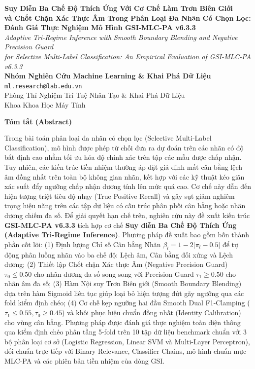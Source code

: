 \documentclass[10pt,a4paper,twoside]{article}
\begin{document}
\thispagestyle{firstpage}

\begin{center}
    {\LARGE\bfseries Suy Diễn Ba Chế Độ Thích Ứng Với Cơ Chế Làm Trơn Biên Giới\\ và Chốt Chặn Xác Thực Âm Trong Phân Loại Đa Nhãn Có Chọn Lọc:\\[0.3em] Đánh Giá Thực Nghiệm Mô Hình GSI-MLC-PA v6.3.3}\\[0.6em]
    {\large\textit{Adaptive Tri-Regime Inference with Smooth Boundary Blending and Negative Precision Guard\\ for Selective Multi-Label Classification: An Empirical Evaluation of GSI-MLC-PA v6.3.3}}\\[0.9em]
    {\textbf{Nhóm Nghiên Cứu Machine Learning \& Khai Phá Dữ Liệu}}\\[0.2em]
    {\texttt{ml.research@lab.edu.vn}}\\[0.2em]
    {\small Phòng Thí Nghiệm Trí Tuệ Nhân Tạo \& Khai Phá Dữ Liệu}\\[0.1em]
    {\small Khoa Khoa Học Máy Tính}\\[0.8em]
\end{center}

\begin{center}\textbf{Tóm tắt (Abstract)}\end{center}
Trong bài toán phân loại đa nhãn có chọn lọc (Selective Multi-Label Classification), mô hình được phép từ chối đưa ra dự đoán trên các nhãn có độ bất định cao nhằm tối ưu hóa độ chính xác trên tập các mẫu được chấp nhận. Tuy nhiên, các kiến trúc tiền nhiệm thường áp đặt giả định mất cân bằng lệch âm đồng nhất trên toàn bộ không gian nhãn, kết hợp với các kỹ thuật kéo giãn xác suất đẩy ngưỡng chấp nhận dương tính lên mức quá cao. Cơ chế này dẫn đến hiện tượng triệt tiêu độ nhạy (True Positive Recall) và gây sụt giảm nghiêm trọng hiệu năng trên các tập dữ liệu có cấu trúc phân phối cân bằng hoặc nhãn dương chiếm đa số. Để giải quyết hạn chế trên, nghiên cứu này đề xuất kiến trúc \textbf{GSI-MLC-PA v6.3.3} tích hợp cơ chế \textbf{Suy diễn Ba Chế Độ Thích Ứng (Adaptive Tri-Regime Inference)}. Phương pháp đề xuất bao gồm bốn thành phần cốt lõi: (1) Định lượng Chỉ số Cân bằng Nhãn $\beta_l = 1 - 2|\pi_l - 0.5|$ để tự động phân luồng nhãn vào ba chế độ: Lệch âm, Cân bằng đối xứng và Lệch dương; (2) Thiết lập Chốt chặn Xác thực Âm (Negative Precision Guard) $\tau_0 \le 0.50$ cho nhãn dương đa số song song với Precision Guard $\tau_1 \ge 0.50$ cho nhãn âm đa số; (3) Hàm Nội suy Trơn Biên giới (Smooth Boundary Blending) dựa trên hàm Sigmoid liên tục giúp loại bỏ hiện tượng đứt gãy ngưỡng qua các fold kiểm định chéo; (4) Cơ chế kẹp ngưỡng hai đầu Smooth Dual F1-Clamping ($\tau_1 \le 0.55, \tau_0 \ge 0.45$) và khôi phục hiệu chuẩn đồng nhất (Identity Calibration) cho vùng cân bằng. Phương pháp được đánh giá thực nghiệm toàn diện thông qua kiểm định chéo phân tầng 5-fold trên 10 tập dữ liệu benchmark chuẩn với 3 bộ phân loại cơ sở (Logistic Regression, Linear SVM và Multi-Layer Perceptron), đối chuẩn trực tiếp với Binary Relevance, Classifier Chains, mô hình chuẩn mực MLC-PA và các phiên bản tiền nhiệm của dòng GSI.
\end{document}
